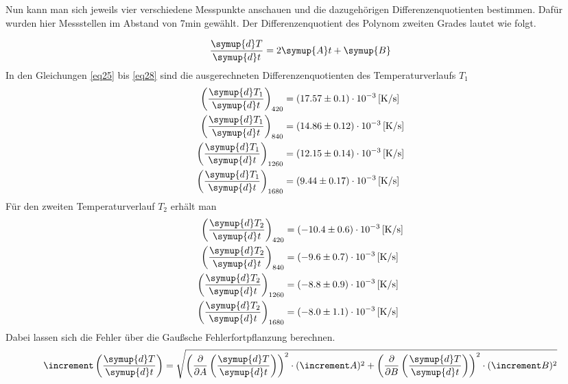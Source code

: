 \begin{flushleft}
Nun kann man sich jeweils vier verschiedene Messpunkte anschauen und die dazugehörigen Differenzenquotienten bestimmen. Dafür wurden hier
Messstellen im Abstand von 7min gewählt.
Der Differenzenquotient des Polynom zweiten Grades lautet wie folgt.
\end{flushleft}
\begin{equation}
\frac{\symup{d}T}{\symup{d}t} = 2 \symup{A} t + \symup{B}
\end{equation}
In den Gleichungen \eqref{eq25} bis \eqref{eq28} sind die ausgerechneten Differenzenquotienten des Temperaturverlaufs $T_{1}$
\begin{align}
\left( \frac{\symup{d}T_{1}}{\symup{d}t}\right)_{420} &= (17.57\pm0.1)\cdot 10^{-3} \, \text{[K/s]} \label{eq25}\\
\left(\frac{\symup{d}T_{1}}{\symup{d}t}\right)_{840} &= (14.86\pm0.12)\cdot 10^{-3} \,\text{[K/s]}\\
\left(\frac{\symup{d}T_{1}}{\symup{d}t}\right)_{1260} &= (12.15\pm0.14)\cdot 10^{-3} \, \text{[K/s]}\\
\left(\frac{\symup{d}T_{1}}{\symup{d}t}\right)_{1680} &= (9.44\pm0.17)\cdot 10^{-3} \, \text{[K/s]} \label{eq28}
\end{align}
Für den zweiten Temperaturverlauf $T_{2}$ erhält man
\begin{align}
\left( \frac{\symup{d}T_{2}}{\symup{d}t}\right)_{420} &= (-10.4\pm0.6)\cdot 10^{-3} \, \text{[K/s]} \label{eq29}\\
\left(\frac{\symup{d}T_{2}}{\symup{d}t}\right)_{840} &= (-9.6\pm0.7)\cdot 10^{-3} \,\text{[K/s]}\\
\left(\frac{\symup{d}T_{2}}{\symup{d}t}\right)_{1260} &= (-8.8\pm0.9)\cdot 10^{-3} \, \text{[K/s]}\\
\left(\frac{\symup{d}T_{2}}{\symup{d}t}\right)_{1680} &= (-8.0\pm1.1)\cdot 10^{-3} \, \text{[K/s]} \label{eq32}
\end{align}
Dabei lassen sich die Fehler über die Gaußsche Fehlerfortpflanzung berechnen.
\begin{equation}
  \increment \left( \frac{\symup{d}T}{\symup{d}t}\right) = \sqrt{\left( \frac{\partial}{\partial A} \left( \frac{\symup{d}T}{\symup{d}t} \right)\right)^{2} \cdot (\increment A)^{2} + \left( \frac{\partial}{\partial B} \left( \frac{\symup{d}T}{\symup{d}t} \right)\right)^{2} \cdot (\increment B)^{2} }
  \label{eqn:gaussianmistake}
\end{equation}
